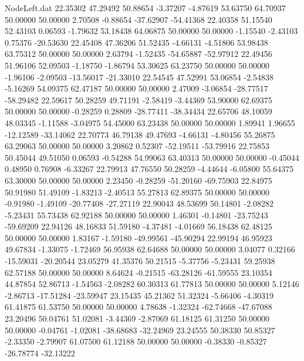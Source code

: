 \begin{filecontents}{NodeLeft.dat}
  22.35302   47.29492   50.88654    -3.37207   -4.87619   53.63750   64.70937   50.00000   50.00000    2.70508   -0.88654  -37.62907  -54.41368
  22.40358   51.15540   52.43103     0.06593   -1.79632   53.18438   64.06875   50.00000   50.00000   -1.15540   -2.43103    0.75376  -20.53630
  22.45408   47.36206   51.52435    -4.66131   -4.51806   53.98438   63.75312   50.00000   50.00000    2.63794   -1.52435  -54.65887  -52.97912
  22.49456   51.96106   52.09503    -1.18750   -1.86794   53.30625   63.23750   50.00000   50.00000   -1.96106   -2.09503  -13.56017  -21.33010
  22.54545   47.52991   53.06854    -2.54838   -5.16269   54.09375   62.47187   50.00000   50.00000    2.47009   -3.06854  -28.77517  -58.29482
  22.59617   50.28259   49.71191    -2.58419   -3.44369   53.90000   62.69375   50.00000   50.00000   -0.28259    0.28809  -28.77411  -38.34434
  22.65706   48.10059   48.03345    -1.11588   -3.04975   54.45000   63.23438   50.00000   50.00000    1.89941    1.96655  -12.12589  -33.14062
  22.70773   46.79138   49.47693    -4.66131   -4.80456   55.26875   63.29063   50.00000   50.00000    3.20862    0.52307  -52.19511  -53.79916
  22.75853   50.45044   49.51050     0.06593   -0.54288   54.99063   63.40313   50.00000   50.00000   -0.45044    0.48950    0.76908   -6.33267
  22.79913   47.76550   50.28259    -4.44644   -6.05800   55.64375   63.30000   50.00000   50.00000    2.23450   -0.28259  -51.20160  -69.75903
  22.84975   50.91980   51.49109    -1.83213   -2.40513   55.27813   62.89375   50.00000   50.00000   -0.91980   -1.49109  -20.77408  -27.27119
  22.90043   48.53699   50.14801    -2.08282   -5.23431   55.73438   62.92188   50.00000   50.00000    1.46301   -0.14801  -23.75243  -59.69209
  22.94126   48.16833   51.59180    -4.37481   -4.01669   56.18438   62.48125   50.00000   50.00000    1.83167   -1.59180  -49.99561  -45.90294
  22.99194   46.95923   49.67834    -1.33075   -1.72469   56.95938   62.64688   50.00000   50.00000    3.04077    0.32166  -15.59031  -20.20544
  23.05279   41.35376   50.21515    -5.37756   -5.23431   59.25938   62.57188   50.00000   50.00000    8.64624   -0.21515  -63.28126  -61.59555
  23.10354   44.87854   52.86713    -1.54563   -2.08282   60.30313   61.77813   50.00000   50.00000    5.12146   -2.86713  -17.51284  -23.59947
  23.15435   45.21362   51.32324    -5.66406   -4.30319   61.41875   61.53750   50.00000   50.00000    4.78638   -1.32324  -62.74668  -47.67088
  23.20496   50.04761   51.02081    -3.44369   -2.87069   61.18125   61.31250   50.00000   50.00000   -0.04761   -1.02081  -38.68683  -32.24969
  23.24555   50.38330   50.85327    -2.33350   -2.79907   61.07500   61.12188   50.00000   50.00000   -0.38330   -0.85327  -26.78774  -32.13222

\end{filecontents}
